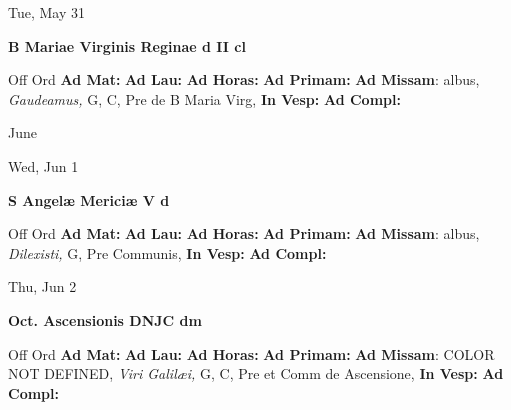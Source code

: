 \documentclass[10pt]{memoir}
\begin{document}
\begin{center}
\begin{minipage}{3.5in}
\vspace{2em}
\begin{center}Tue, May 31
\end{center}
\textbf{ \large B Mariae Virginis Reginae
\textnormal{\normalsize d II cl}}

\begin{justify}Off Ord
\textbf{Ad Mat: }
\textbf{Ad Lau: }
\textbf{Ad Horas: }
\textbf{Ad Primam: }\textbf{Ad Missam}: albus, \textit{Gaudeamus,} G, C, Pre de B Maria Virg, 
\textbf{In Vesp: }
\textbf{Ad Compl: }
\end{justify}
\end{minipage}
\end{center}

\begin{center}
\pagebreak
\thispagestyle{empty}
{\Huge June}
\end{center}
                    
\begin{center}
\begin{minipage}{3.5in}
\vspace{2em}
\begin{center}Wed, Jun 1
\end{center}
\textbf{ \large S Angelæ Mericiæ V
\textnormal{\normalsize d}}

\begin{justify}Off Ord
\textbf{Ad Mat: }
\textbf{Ad Lau: }
\textbf{Ad Horas: }
\textbf{Ad Primam: }\textbf{Ad Missam}: albus, \textit{Dilexisti,} G, Pre Communis, 
\textbf{In Vesp: }
\textbf{Ad Compl: }
\end{justify}
\end{minipage}
\end{center}

\begin{center}
\begin{minipage}{3.5in}
\vspace{2em}
\begin{center}Thu, Jun 2
\end{center}
\textbf{ \large Oct. Ascensionis DNJC
\textnormal{\normalsize dm}}

\begin{justify}Off Ord
\textbf{Ad Mat: }
\textbf{Ad Lau: }
\textbf{Ad Horas: }
\textbf{Ad Primam: }\textbf{Ad Missam}: COLOR NOT DEFINED, \textit{Viri Galilæi,} G, C, Pre et Comm de Ascensione, 
\textbf{In Vesp: }
\textbf{Ad Compl: }
\end{justify}
\end{minipage}
\end{center}
\end{document}
